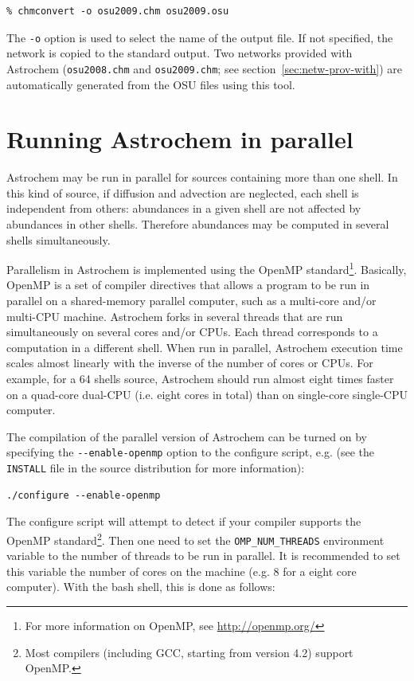 \documentclass[a4paper,12pt]{article}
\begin{document}
\begin{verbatim}
% chmconvert -o osu2009.chm osu2009.osu
\end{verbatim}

\noindent
The \verb=-o= option is used to select the name of the output file. If
not specified, the network is copied to the standard output. Two
networks provided with Astrochem (\verb=osu2008.chm= and
\verb=osu2009.chm=; see section~\ref{sec:netw-prov-with}) are
automatically generated from the OSU files using this tool.

\section{Running Astrochem in parallel}
\label{sec:runn-astr-parall}

Astrochem may be run in parallel for sources containing more than one
shell. In this kind of source, if diffusion and advection are
neglected, each shell is independent from others: abundances in a
given shell are not affected by abundances in other shells. Therefore
abundances may be computed in several shells simultaneously.

Parallelism in Astrochem is implemented using the OpenMP
standard\footnote{For more information on OpenMP, see
  \url{http://openmp.org/}}. Basically, OpenMP is a set of compiler
directives that allows a program to be run in parallel on a
shared-memory parallel computer, such as a multi-core and/or multi-CPU
machine. Astrochem forks in several threads that are run
simultaneously on several cores and/or CPUs. Each thread corresponds
to a computation in a different shell. When run in parallel, Astrochem
execution time scales almost linearly with the inverse of the number
of cores or CPUs. For example, for a 64 shells source, Astrochem
should run almost eight times faster on a quad-core dual-CPU
(i.e. eight cores in total) than on single-core single-CPU computer.

The compilation of the parallel version of Astrochem can be turned on
by specifying the \verb=--enable-openmp= option to the configure
script, e.g. (see the \verb=INSTALL= file in the source distribution
for more information):

\begin{verbatim}
./configure --enable-openmp
\end{verbatim}
 
\noindent
The configure script will attempt to detect if your compiler supports
the OpenMP standard\footnote{Most compilers (including GCC, starting
  from version 4.2) support OpenMP.}. Then one need to set the
\verb=OMP_NUM_THREADS= environment variable to the number of threads
to be run in parallel. It is recommended to set this variable
the number of cores on the machine (e.g. 8 for a eight core
computer). With the bash shell, this is done as follows:
\end{document}
